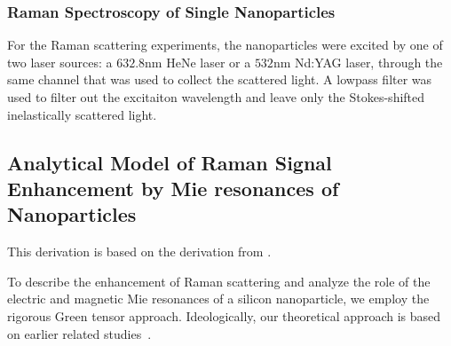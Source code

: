         \subsubsection{Raman Spectroscopy of Single Nanoparticles}
        \label{sec:Raman}
                For the Raman scattering experiments, the nanoparticles were excited by one of two laser sources: a $632.8$nm HeNe laser
            or a $532$nm Nd:YAG laser, through the same channel that was used to collect the scattered light. A lowpass filter was used
            to filter out the excitaiton wavelength and leave only the Stokes-shifted inelastically scattered light.

    \subsection{Analytical Model of Raman Signal Enhancement by Mie resonances of Nanoparticles}
        \label{sec:Theory}
            This derivation is based on the derivation from \cite{dmitriev2016resonant}.

            To describe the enhancement of Raman scattering and analyze the role of the electric and magnetic
        Mie resonances of a silicon nanoparticle, we employ the rigorous Green tensor approach. Ideologically,
        our theoretical approach is based on earlier related studies~\cite{canccado2014theory, murphy1983enhanced}.

